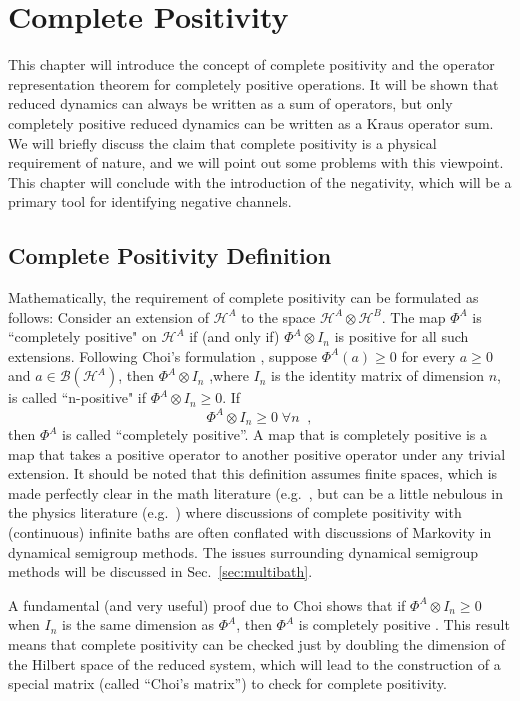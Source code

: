 \chapter{Complete Positivity}
This chapter will introduce the concept of complete positivity and the operator representation theorem for completely positive operations.  It will be shown that reduced dynamics can always be written as a sum of operators, but only completely positive reduced dynamics can be written as a Kraus operator sum.  We will briefly discuss the claim that complete positivity is a physical requirement of nature, and we will point out some problems with this viewpoint.  This chapter will conclude with the introduction of the negativity, which will be a primary tool for identifying negative channels.

\section{Complete Positivity Definition}
\label{sec:cpDef}

Mathematically, the requirement of complete positivity can be formulated as follows: Consider an extension of $\mathcal{H}^A$ to the space $\mathcal{H}^A\otimes\mathcal{H}^B$.  The map $\Phi^A$ is ``completely positive" on $\mathcal{H}^A$ if (and only if) $\Phi^A\otimes I_n$ is positive for all such extensions.  Following Choi's formulation \cite{Choi1972,Choi1975}, suppose $\Phi^A(a) \ge 0$ for every $a\ge 0$ and $a\in\mathcal{B}(\mathcal{H}^A)$, then $\Phi^A\otimes I_n $ ,where $I_n$ is the identity matrix of dimension $n$, is called ``n-positive" if $\Phi^A\otimes I_n \ge 0$.  If
\begin{equation}
\Phi^A\otimes I_n \ge 0 \;\forall n\;\;,
\end{equation}
then $\Phi^A$ is called ``completely positive''.  A map that is completely positive is a map that takes a positive operator to another positive operator under any trivial extension.  It should be noted that this definition assumes finite spaces, which is made perfectly clear in the math literature (e.g.\ \cite{Choi1975,Stinespring1955}, but can be a little nebulous in the physics literature (e.g.\ \cite{Benatti2005}) where discussions of complete positivity with (continuous) infinite baths are often conflated with discussions of Markovity in dynamical semigroup methods.  The issues surrounding dynamical semigroup methods will be discussed in Sec.\ \ref{sec:multibath}.

A fundamental (and  very useful) proof due to Choi shows that if $\Phi^A\otimes I_n \ge 0$ when $I_n$ is the same dimension as $\Phi^A$, then $\Phi^A$ is completely positive \cite{Choi1972,Choi1975}.  This result means that complete positivity can be checked just by doubling the dimension of the Hilbert space of the reduced system, which will lead to the construction of a special matrix (called ``Choi's matrix'') to check for complete positivity.

